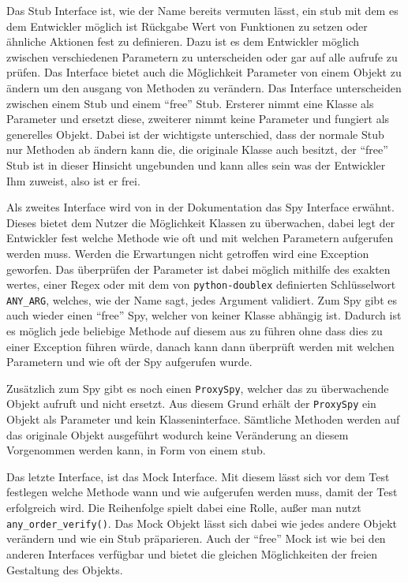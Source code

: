 Das Stub Interface ist, wie der Name bereits vermuten lässt, ein \Gls{stub}
mit dem es dem Entwickler möglich ist Rückgabe Wert von Funktionen zu setzen oder ähnliche
Aktionen fest zu definieren. Dazu ist es dem Entwickler möglich zwischen verschiedenen
Parametern zu unterscheiden oder gar auf alle aufrufe zu prüfen. Das Interface bietet auch
die Möglichkeit Parameter von einem Objekt zu ändern um den ausgang von Methoden zu verändern.
Das Interface unterscheiden zwischen einem Stub und einem "`free"' Stub. Ersterer nimmt eine
Klasse als Parameter und ersetzt diese, zweiterer nimmt keine Parameter und fungiert als
generelles Objekt. Dabei ist der wichtigste unterschied, dass der normale Stub nur 
Methoden ab ändern kann die, die originale Klasse auch besitzt, der "`free"' Stub 
ist in dieser Hinsicht ungebunden und kann alles sein was der Entwickler Ihm zuweist,
also ist er frei.

Als zweites Interface wird von \cite{doublex:docs:1.8.1} in der Dokumentation das Spy Interface
erwähnt. Dieses bietet dem Nutzer die Möglichkeit Klassen zu überwachen, dabei legt der Entwickler
fest welche Methode wie oft und mit welchen Parametern aufgerufen werden muss. Werden die 
Erwartungen nicht getroffen wird eine Exception geworfen. Das überprüfen der Parameter ist dabei
möglich mithilfe des exakten wertes, einer Regex oder mit dem von \lstinline{python-doublex}
definierten Schlüsselwort \lstinline{ANY_ARG}, welches, wie der Name sagt, jedes Argument
validiert. Zum Spy gibt es auch wieder einen "`free"' Spy, welcher von keiner Klasse
abhängig ist. Dadurch ist es möglich jede beliebige Methode auf diesem aus zu führen ohne
dass dies zu einer Exception führen würde, danach kann dann überprüft werden mit welchen
Parametern und wie oft der Spy aufgerufen wurde.

Zusätzlich zum Spy gibt es noch einen \lstinline{ProxySpy}, welcher das zu überwachende
Objekt aufruft und nicht ersetzt. Aus diesem Grund erhält der \lstinline{ProxySpy} ein
Objekt als Parameter und kein Klasseninterface. Sämtliche Methoden werden auf das originale
Objekt ausgeführt wodurch keine Veränderung an diesem Vorgenommen werden kann, in Form von
einem \Gls{stub}.

Das letzte Interface, ist das Mock Interface. Mit diesem lässt sich vor dem Test festlegen
welche Methode wann und wie aufgerufen werden muss, damit der Test erfolgreich wird. Die
Reihenfolge spielt dabei eine Rolle, außer man nutzt \lstinline{any_order_verify()}.
Das Mock Objekt lässt sich dabei wie jedes andere Objekt verändern und wie ein Stub
präparieren. Auch der "`free"' Mock ist wie bei den anderen Interfaces verfügbar und
bietet die gleichen Möglichkeiten der freien Gestaltung des Objekts.

